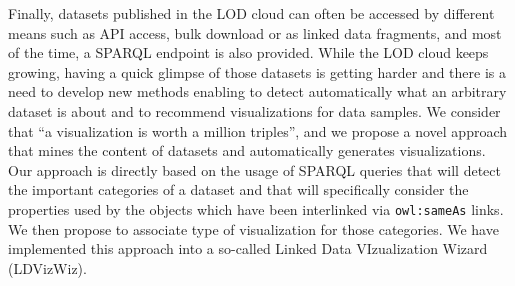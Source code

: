 Finally, datasets published in the LOD cloud can often be accessed by different means such as API access, bulk download or as linked data fragments, and most of the time, a SPARQL endpoint is also provided. While the LOD cloud keeps growing, having a quick glimpse of those datasets is getting harder and there is a need to develop new methods enabling to detect automatically what an arbitrary dataset is about and to recommend visualizations for data samples. We consider that ``a visualization is worth a million triples'', and  we propose a novel approach that mines the content of datasets and automatically generates visualizations. Our approach is directly based on the usage of SPARQL queries that will detect the important categories of a dataset and that will specifically consider the properties used by the objects which have been interlinked via \texttt{owl:sameAs} links. We then propose to associate type of visualization for those categories. We have implemented this approach into a so-called Linked Data VIzualization Wizard (LDVizWiz).